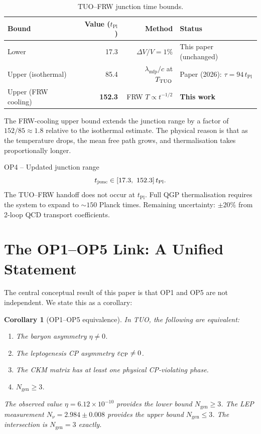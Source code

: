 \documentclass[12pt,a4paper]{article}
\newtheorem{corollary}[theorem]{Corollary}
\theoremstyle{definition}
\newcommand{\tPl}{t_{\mathrm{Pl}}}
\newcommand{\Ngen}{N_{\mathrm{gen}}}
\newcommand{\Hmfp}{\lambda_{\mathrm{mfp}}}
\newcommand{\eps}{\varepsilon}
\begin{document}
\begin{table}[h]
\centering
\caption{TUO--FRW junction time bounds.}
\label{tab:junction}
\begin{tabular}{lrrl}
\toprule
Bound & Value ($\tPl$) & Method & Status \\
\midrule
Lower & 17.3 & $\Delta V/V = 1\%$ & This paper (unchanged) \\
Upper (isothermal) & 85.4 & $\Hmfp/c$ at $T_{\rm TUO}$ & Paper (2026): $\tau = 94\,\tPl$ \\
\rowcolor{lightgold}
Upper (FRW cooling) & \textbf{152.3} & FRW $T\propto t^{-1/2}$ & \textbf{This work} \\
\bottomrule
\end{tabular}
\end{table}

The FRW-cooling upper bound extends the junction range by a factor of
$152/85 \approx 1.8$ relative to the isothermal estimate. The physical
reason is that as the temperature drops, the mean free path grows, and
thermalisation takes proportionally longer.

\begin{resultbox}{OP4 -- Updated junction range}
\begin{equation}
  t_{\rm junc} \in [17.3,\ 152.3]\,\tPl.
\end{equation}
The TUO--FRW handoff does not occur at $\tPl$. Full QGP thermalisation
requires the system to expand to $\sim 150$ Planck times.
Remaining uncertainty: $\pm20\%$ from 2-loop QCD transport coefficients.
\end{resultbox}

\section{The OP1--OP5 Link: A Unified Statement}
\label{sec:link}

The central conceptual result of this paper is that OP1 and OP5 are not
independent. We state this as a corollary:

\begin{corollary}[OP1--OP5 equivalence]
\label{cor:op1op5}
In TUO, the following are equivalent:
\begin{enumerate}
\item The baryon asymmetry $\eta \neq 0$.
\item The leptogenesis CP asymmetry $\eps_{\rm CP} \neq 0$.
\item The CKM matrix has at least one physical CP-violating phase.
\item $\Ngen \geq 3$.
\end{enumerate}
The observed value $\eta = 6.12\times10^{-10}$ provides the lower bound
$\Ngen \geq 3$. The LEP measurement $N_\nu = 2.984 \pm 0.008$ provides the
upper bound $\Ngen \leq 3$. The intersection is $\Ngen = 3$ exactly.
\end{corollary}
\end{document}
